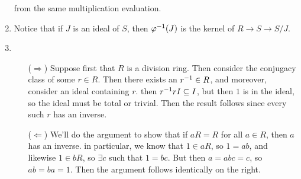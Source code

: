 \documentclass[12pt, twosided]{article}
\begin{document}
\begin{enumerate}
  from the same multiplication evaluation.
\item Notice that if \(J\) is an ideal of \(S\), then \(\varphi^{-1}(J)\) is the kernel of \(R \to S \to S/J\).
\item
  \begin{enumerate}
  \item [(\(\Rightarrow\))] Suppose first that \(R\) is a division ring. Then consider the conjugacy class of some \(r \in R\). Then there exists an \(r^{-1} \in R\), and moreover, consider an ideal containing \(r\). then \(r^{-1}rI \subseteq I\), but then \(1\) is in the ideal, so the ideal must be total or trivial. Then the result follows since every such \(r\) has an inverse.
  \item [(\(\Leftarrow\))] We'll do the argument to show that if \(aR = R\) for all \(a \in R\), then \(a\) has an inverse. in particular, we know that \(1 \in aR\), so \(1 = ab\), and likewise \(1 \in bR\), so \(\exists c\) such that \(1 = bc\). But then \(a = abc =c\), so \(ab = ba = 1\). Then the argument follows identically on the right.
  \end{enumerate}
\end{enumerate}
\end{document}
